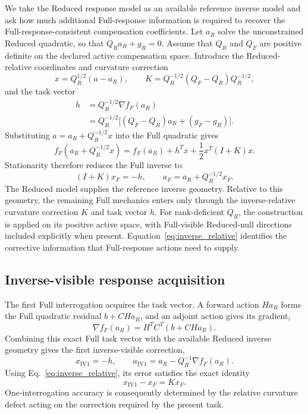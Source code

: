 We take the Reduced response model as an available reference inverse model and ask how much additional Full-response information is required to recover the Full-response-consistent compensation coefficients. Let \(a_R\) solve the unconstrained Reduced quadratic, so that \(Q_Ra_R+g_R=0\). Assume that \(Q_R\) and \(Q_F\) are positive definite on the declared active compensation space. Introduce the Reduced-relative coordinates and curvature correction
\[
x=Q_R^{1/2}(a-a_R),
\qquad
K=Q_R^{-1/2}(Q_F-Q_R)Q_R^{-1/2},
\]
and the task vector
\[
\begin{aligned}
h&=Q_R^{-1/2}\nabla f_F(a_R)\\
 &=Q_R^{-1/2}\big[(Q_F-Q_R)a_R+(g_F-g_R)\big].
\end{aligned}
\]
Substituting \(a=a_R+Q_R^{-1/2}x\) into the Full quadratic gives
\[
f_F(a_R+Q_R^{-1/2}x)
=f_F(a_R)+h^Tx+\frac12x^T(I+K)x.
\]
Stationarity therefore reduces the Full inverse to
\begin{equation}
(I+K)x_F=-h,
\qquad
a_F=a_R+Q_R^{-1/2}x_F.
\label{eq:inverse_relative}
\end{equation}
The Reduced model supplies the reference inverse geometry. Relative to this geometry, the remaining Full mechanics enters only through the inverse-relative curvature correction \(K\) and task vector \(h\). For rank-deficient \(Q_R\), the construction is applied on its positive active space, with Full-visible Reduced-null directions included explicitly when present. Equation~\eqref{eq:inverse_relative} identifies the corrective information that Full-response actions need to supply.

\subsection{Inverse-visible response acquisition}
\label{sec:inverse_visible_acquisition}

The first Full interrogation acquires the task vector. A forward action \(Ha_R\) forms the Full quadratic residual \(b+CHa_R\), and an adjoint action gives its gradient,
\[
\nabla f_F(a_R)=H^TC^T(b+CHa_R).
\]
Combining this exact Full task vector with the available Reduced inverse geometry gives the first inverse-visible correction,
\begin{equation}
x_{\mathrm{IV1}}=-h,
\qquad
a_{\mathrm{IV1}}=a_R-Q_R^{-1}\nabla f_F(a_R).
\label{eq:iv1}
\end{equation}
Using Eq.~\eqref{eq:inverse_relative}, its error satisfies the exact identity
\begin{equation}
x_{\mathrm{IV1}}-x_F=Kx_F.
\label{eq:iv1_error}
\end{equation}
One-interrogation accuracy is consequently determined by the relative curvature defect acting on the correction required by the present task.

